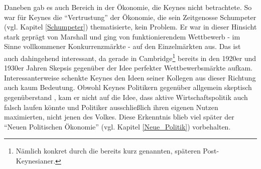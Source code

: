 Daneben gab es auch Bereich in der Ökonomie, die Keynes nicht betrachtete. So war für Keynes die "`Vertrustung"' der Ökonomie, die sein Zeitgenosse Schumpeter (vgl. Kapitel \ref{Schumpeter}) thematisierte, kein Problem. Er war in dieser Hinsicht stark geprägt von Marshall und ging von funktionierendem Wettbewerb - im Sinne vollkommener Konkurrenzmärkte - auf den Einzelmärkten aus. Das ist auch dahingehend interessant, da gerade in Cambridge\footnote{Nämlich konkret durch die bereits kurz genannten, späteren Post-Keynesianer.} bereits in den 1920er und 1930er Jahren Skepsis gegenüber der Idee perfekter Wettbewerbsmärkte aufkam. Interessanterweise schenkte Keynes den Ideen seiner Kollegen aus dieser Richtung auch kaum Bedeutung. Obwohl Keynes Politikern gegenüber allgemein skeptisch gegenüberstand \parencite[S. 291]{Scherf1989}, kam er nicht auf die Idee, dass aktive Wirtschaftspolitik auch falsch laufen könnte und Politiker ausschließlich ihren eigenen Nutzen maximierten, nicht jenen des Volkes. Diese Erkenntnis blieb viel später der "`Neuen Politischen Ökonomie"' (vgl. Kapitel \ref{Neue_Politik}) vorbehalten. 



